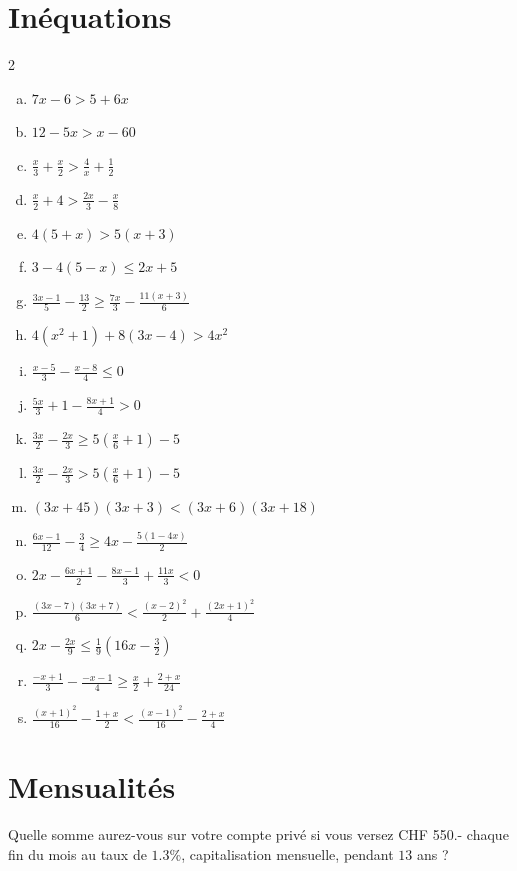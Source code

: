 \documentclass[twoside, a4paper, 12pt, openright, fullpage]{book}
\begin{document}
\section{Inéquations}

\begin{exercice}\label{inequations}
\begin{multicols}{2}
\begin{enumerate}[a)]
\item $7x-6>5+6x$
\item $12-5x>x-60$
\item $ \frac{x}{3}+\frac{x}{2}>\frac{4}{x}+\frac{1}{2}$
\item $ \frac{x}{2}+4 >\frac{2x}{3}-\frac{x}{8}$
\item $4(5+x) >5(x+3)$
\item $3-4(5-x) \leq 2x+5$
\item $\frac{3x-1}{5}-\frac{13}{2} \geq \frac{7x}{3}-\frac{11(x+3)}{6}$
\item $4(x^2+1)+8(3x-4)>4x^2$
\item $\frac{x-5}{3}-\frac{x-8}{4}\leq 0$
\item $\frac{5x}{3}+1-\frac{8x+1}{4}>0$
\item $\frac{3x}{2}-\frac{2x}{3}\geq 5\left(\frac{x}{6}+1\right) -5$
\item $\frac{3x}{2}-\frac{2x}{3}> 5\left(\frac{x}{6}+1\right) -5$
\item $(3x+45)(3x+3)<(3x+6)(3x+18)$
\item $\frac{6x-1}{12}-\frac{3}{4}\geq 4x-\frac{5(1-4x)}{2}$
\item $2x-\frac{6x+1}{2}-\frac{8x-1}{3}+\frac{11x}{3}<0$
\item $\frac{(3x-7)(3x+7)}{6}<\frac{(x-2)^2}{2}+\frac{(2x+1)^2}{4}$
\item $2x-\frac{2x}{9}\leq \frac{1}{9}\left(16x-\frac{3}{2}\right)$
\item $\frac{-x+1}{3}-\frac{-x-1}{4}\geq \frac{x}{2}+\frac{2+x}{24}$
\item $\frac{(x+1)^2}{16}-\frac{1+x}{2}<\frac{(x-1)^2}{16}-\frac{2+x}{4}$
\end{enumerate}
\end{multicols}
\end{exercice}

\section{Mensualités}

\begin{exercice}\label{mensualite1}
Quelle somme aurez-vous sur votre compte privé si vous versez CHF 550.- chaque fin du mois au taux de $1.3\%$, capitalisation mensuelle, pendant $13$ ans ?
\end{exercice}
\end{document}

